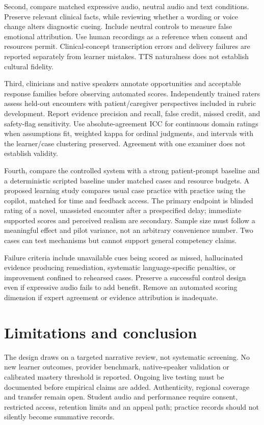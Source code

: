 \documentclass[pmlr,twocolumn,10pt]{jmlr}
\begin{document}
Second, compare matched expressive audio, neutral audio and text conditions. Preserve relevant clinical facts, while reviewing whether a wording or voice change alters diagnostic cueing. Include neutral controls to measure false emotional attribution. Use human recordings as a reference when consent and resources permit. Clinical-concept transcription errors and delivery failures are reported separately from learner mistakes. TTS naturalness does not establish cultural fidelity.

Third, clinicians and native speakers annotate opportunities and acceptable response families before observing automated scores. Independently trained raters assess held-out encounters with patient/caregiver perspectives included in rubric development. Report evidence precision and recall, false credit, missed credit, and safety-flag sensitivity. Use absolute-agreement ICC for continuous domain ratings when assumptions fit, weighted kappa for ordinal judgments, and intervals with the learner/case clustering preserved. Agreement with one examiner does not establish validity.

Fourth, compare the controlled system with a strong patient-prompt baseline and a deterministic scripted baseline under matched cases and resource budgets. A proposed learning study compares usual case practice with practice using the copilot, matched for time and feedback access. The primary endpoint is blinded rating of a novel, unassisted encounter after a prespecified delay; immediate supported scores and perceived realism are secondary. Sample size must follow a meaningful effect and pilot variance, not an arbitrary convenience number. Two cases can test mechanisms but cannot support general competency claims.

Failure criteria include unavailable cues being scored as missed, hallucinated evidence producing remediation, systematic language-specific penalties, or improvement confined to rehearsed cases. Preserve a successful control design even if expressive audio fails to add benefit. Remove an automated scoring dimension if expert agreement or evidence attribution is inadequate.

\section{Limitations and conclusion}
The design draws on a targeted narrative review, not systematic screening. No new learner outcomes, provider benchmark, native-speaker validation or calibrated mastery threshold is reported. Ongoing live testing must be documented before empirical claims are added. Authenticity, regional coverage and transfer remain open. Student audio and performance require consent, restricted access, retention limits and an appeal path; practice records should not silently become summative records.
\end{document}
